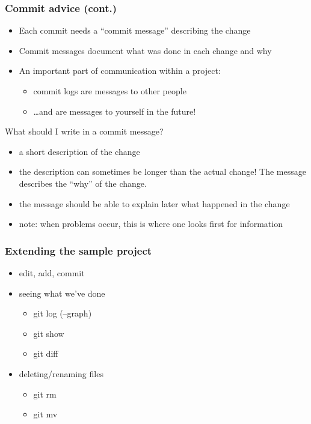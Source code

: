 \begin{frame}
\frametitle{Commit advice (cont.)}

\begin{itemize}
    \item Each commit needs a “commit message” describing the
    change
    \item Commit messages document what was done in each
    change and why
    \item An important part of communication within a project:
    \begin{itemize}
        \item commit logs are messages to other people
        \item \ldots and are messages to yourself in the future!
    \end{itemize}
\end{itemize}

What should I write in a commit message?
\begin{itemize}
    \item a short description of the change
    \item the description can sometimes be longer than the actual
    change! The message describes the “why” of the change.
    \item the message should be able to explain later what
    happened in the change
    \item note: when problems occur, this is where one looks ﬁrst for
        information
\end{itemize}

\end{frame}

\begin{frame}
\frametitle{Extending the sample project}
\begin{itemize}
    \item edit, add, commit
    \item seeing what we've done
    \begin{itemize}
        \item git log (--graph)
        \item git show
        \item git diff
    \end{itemize}
    \item deleting/renaming files
    \begin{itemize}
        \item git rm
        \item git mv
    \end{itemize}
\end{itemize}
\end{frame}


